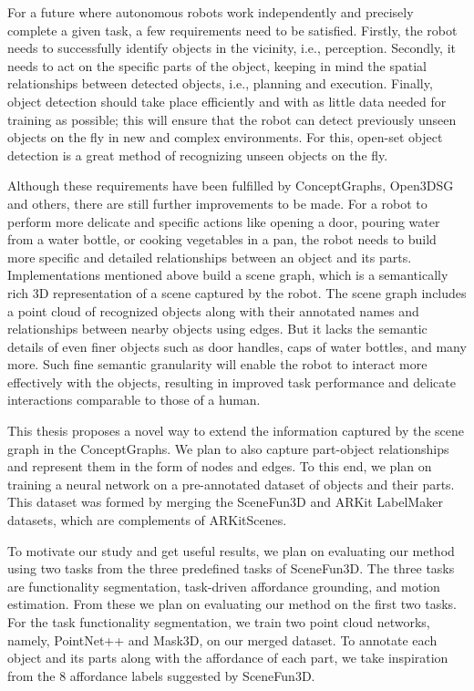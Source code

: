 For a future where autonomous robots work independently and precisely complete a given task, a few requirements need to be satisfied. 
Firstly, the robot needs to successfully identify objects in the vicinity, i.e., perception. Secondly, it needs to act on the specific parts of the object,
 keeping in mind the spatial relationships between detected objects, i.e., planning and execution. Finally, object detection should take place
  efficiently and with as little data needed for training as possible; this will ensure that the robot can detect previously unseen objects on 
  the fly in new and complex environments. For this, open-set object detection is a great method of recognizing unseen objects on the fly.
   
Although these requirements have been fulfilled by ConceptGraphs, Open3DSG and others, there are still further improvements to be made. 
   For a robot to perform more delicate and specific actions like opening a door, pouring water from a water bottle, or cooking vegetables in a pan, 
   the robot needs to build more specific and detailed relationships between an object and its parts. 
   Implementations mentioned above build a scene graph, which is a semantically rich 3D representation of a scene captured by the robot. 
   The scene graph includes a point cloud of recognized objects along with their annotated names and relationships between nearby objects using edges.
    But it lacks the semantic details of even finer objects such as door handles, caps of water bottles, and many more. Such fine semantic granularity will enable 
    the robot to interact more effectively with the objects, resulting in improved task performance and delicate interactions comparable to those of a human.

    
This thesis proposes a novel way to extend the information captured by the scene graph in the ConceptGraphs.
     We plan to also capture part-object relationships and represent them in the form of nodes and edges. 
     To this end, we plan on training a neural network on a pre-annotated dataset of objects and their parts. 
     This dataset was formed by merging the SceneFun3D and ARKit LabelMaker datasets, which are complements of ARKitScenes. 
    
     To motivate our study and get useful results, we plan on evaluating our method using two tasks from the three predefined tasks of SceneFun3D. 
     The three tasks are functionality segmentation, task-driven affordance grounding, and motion estimation. From these we plan on evaluating our method on the first two tasks.
      For the task functionality segmentation, we train two point cloud networks, namely, PointNet++ and Mask3D, on our merged dataset. 
      To annotate each object and its parts along with the affordance of each part, we take inspiration from the 8 affordance labels suggested by SceneFun3D.
       
